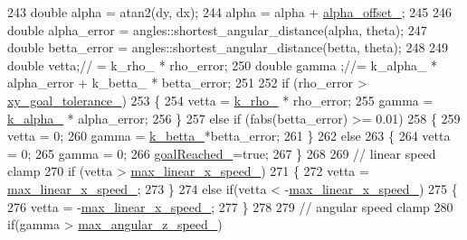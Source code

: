 \begin{DoxyCode}
{243     \textcolor{keywordtype}{double} alpha = atan2(dy, dx);
244     alpha = alpha + \hyperlink{classforward__local__planner_1_1ForwardLocalPlanner_adafa209756b07476ae13564da2d9b292}{alpha\_offset\_};
245 
246     \textcolor{keywordtype}{double} alpha\_error = angles::shortest\_angular\_distance(alpha, theta);
247     \textcolor{keywordtype}{double} betta\_error = angles::shortest\_angular\_distance(betta, theta);
248 
249     \textcolor{keywordtype}{double} vetta;\textcolor{comment}{// = k\_rho\_ * rho\_error;}
250     \textcolor{keywordtype}{double} gamma ;\textcolor{comment}{//= k\_alpha\_ * alpha\_error + k\_betta\_ * betta\_error;}
251 
252     \textcolor{keywordflow}{if} (rho\_error > \hyperlink{classforward__local__planner_1_1ForwardLocalPlanner_a7b8d0133662354613ee30db8571fc380}{xy\_goal\_tolerance\_})
253     \{
254         vetta = \hyperlink{classforward__local__planner_1_1ForwardLocalPlanner_a896f36d17c0c1a798e7129bda4c7b0b0}{k\_rho\_} * rho\_error;
255         gamma = \hyperlink{classforward__local__planner_1_1ForwardLocalPlanner_af707942dc2dc39e5836039929e3e6081}{k\_alpha\_} * alpha\_error;
256     \}
257     \textcolor{keywordflow}{else} \textcolor{keywordflow}{if} (fabs(betta\_error) >= 0.01)
258     \{
259         vetta = 0;
260         gamma = \hyperlink{classforward__local__planner_1_1ForwardLocalPlanner_ace6b518223f0cabe2fd672d438d83f34}{k\_betta\_}*betta\_error;
261     \}
262     \textcolor{keywordflow}{else}
263     \{
264         vetta = 0;
265         gamma = 0;
266         \hyperlink{classforward__local__planner_1_1ForwardLocalPlanner_a2041c1e8216fd7b6e9e00489fc463d4c}{goalReached\_}=\textcolor{keyword}{true};
267     \}
268     
269     \textcolor{comment}{// linear speed clamp}
270     \textcolor{keywordflow}{if} (vetta > \hyperlink{classforward__local__planner_1_1ForwardLocalPlanner_a1fe410ab94742dceb111ce44c01c12f9}{max\_linear\_x\_speed\_})
271     \{
272         vetta = \hyperlink{classforward__local__planner_1_1ForwardLocalPlanner_a1fe410ab94742dceb111ce44c01c12f9}{max\_linear\_x\_speed\_};
273     \}
274     \textcolor{keywordflow}{else} \textcolor{keywordflow}{if}(vetta < -\hyperlink{classforward__local__planner_1_1ForwardLocalPlanner_a1fe410ab94742dceb111ce44c01c12f9}{max\_linear\_x\_speed\_})
275     \{
276         vetta = -\hyperlink{classforward__local__planner_1_1ForwardLocalPlanner_a1fe410ab94742dceb111ce44c01c12f9}{max\_linear\_x\_speed\_};
277     \}
278 
279     \textcolor{comment}{// angular speed clamp}
280     \textcolor{keywordflow}{if}(gamma > \hyperlink{classforward__local__planner_1_1ForwardLocalPlanner_a20ac6eadd636d34bfb82f416152c1f7a}{max\_angular\_z\_speed\_})
}
\end{DoxyCode}
